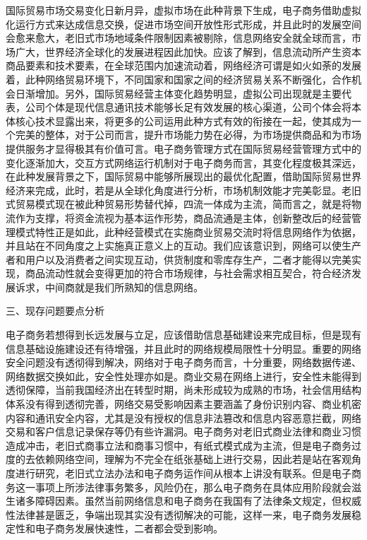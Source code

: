 国际贸易市场交易变化日新月异，虚拟市场在此种背景下生成，电子商务借助虚拟化运行方式来达成信息交换，促进市场空间开放性形式形成，并且此时的发展空间会愈来愈大，老旧式市场地域条件限制因素被剔除，信息网络安全就全球而言，市场广大，世界经济全球化的发展进程因此加快。应该了解到，信息流动所产生资本商品要素和技术要素，在全球范围内加速流动着，网络经济可谓是如火如荼的发展着，此种网络贸易环境下，不同国家和国家之间的经济贸易关系不断强化，合作机会日渐增加。另外，国际贸易经营主体变化趋势明显，虚拟公司出现就是主要代表，公司个体是现代信息通讯技术能够长足有效发展的核心渠道，公司个体会将本体核心技术显露出来，将更多的公司运用此种方式有效的衔接在一起，使其成为一个完美的整体，对于公司而言，提升市场能力势在必得，为市场提供商品和为市场提供服务才显得极其有价值可言。电子商务管理方式在国际贸易经营管理方式中的变化逐渐加大，交互方式网络运行机制对于电子商务而言，其变化程度极其深远，在此种发展背景之下，国际贸易中能够所展现出的最优化配置，借助国际贸易世界经济来完成，此时，若是从全球化角度进行分析，市场机制效能才完美彰显。老旧式贸易模式现在被此种贸易形势替代掉，四流一体成为主流，简而言之，就是将物流作为支撑，将资金流视为基本运作形势，商品流通是主体，创新整改后的经营管理模式特性正是如此，此种经营模式在实施商业贸易交流时将信息网络作为依据，并且站在不同角度之上实施真正意义上的互动。我们应该意识到，网络可以使生产者和用户以及消费者之间实现互动，供货制度和零库存生产，二者才能得以完美实现，商品流动性就会变得更加的符合市场规律，与社会需求相互契合，符合经济发展诉求，中间商就是我们所熟知的信息网络。

三、现存问题要点分析

电子商务若想得到长远发展与立足，应该借助信息基础建设来完成目标，但是现有信息基础设施建设还有待增强，并且此时的网络规模局限性十分明显。重要的网络安全问题没有透彻得到解决，网络对于电子商务而言，十分重要，网络数据传递、网络数据交换如此，安全性处理亦如是。商业交易在网络上进行，安全性未能得到透彻保障，当前我国经济出在转型时期，尚未形成较为成熟的市场，社会信用结构体系没有得到透彻完善，网络交易受影响因素主要涵盖了身份识别内容、商业机密内容和通讯安全内容，尤其是没有授权的信息非法篡改和信息内容恶意拦截，网络交易和客户信息记录保存等仍有些许漏洞。电子商务对老旧式商业法律和商业习惯造成冲击，老旧式商事立法和商事习惯中，有纸式模式成为主流，但是电子商务过度的去依赖网络空间，理解为不完全在纸张基础上进行交易，因此若是站在客观角度进行研究，老旧式立法办法和电子商务运作间从根本上讲没有联系。但是电子商务这一事项上所涉法律事务繁多，风险仍在，那么电子商务在具体应用阶段就会滋生诸多障碍因素。虽然当前网络信息和电子商务在我国有了法律条文规定，但权威性法律甚是匮乏，争端出现其实没有透彻解决的可能，这样一来，电子商务发展稳定性和电子商务发展快速性，二者都会受到影响。

